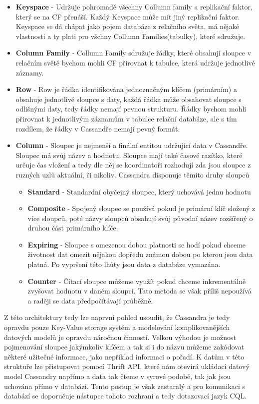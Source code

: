 \begin{itemize}
\item \textbf{Keyspace} - Udržuje pohromadě všechny Collumn family a replikační faktor, který se na CF přenáší. Každý Keyspace může mít jiný replikační faktor. Keyspace se dá chápat jako pojem databáze z relačního světa, má nějaké vlastnosti a ty plati pro všchny Collumn Families(tabulky), které sdružuje.
\item \textbf{Column Family} - Collumn Family sdružuje řádky, které obsahují sloupce v relačním světě bychom mohli CF přirovnat k tabulce, která udržuje jednotlivé záznamy. 
\item \textbf{Row} - Row je řádka identifikována jednoznačným klíčem (primárním) a obsahuje jednotlivé sloupce s daty, každá řádka může obsahovat sloupce s odlišnými daty, tedy řádky nemají pevnou strukturu. Řádky bychom mohli přirovnat k jednotlivým záznamům v tabulce relační databáze, ale s tím rozdílem, že řádky v Cassandře nemají pevný formát. 
\item \textbf{Column} - Sloupec je nejmenší a finální entitou udržující data v Cassandře. Sloupec má svůj název a hodnotu. Sloupce mají také časové razítko, které určuje čas vložení a tedy dle něj se koordinatoři rozhodují zda jsou sloupce z ruzných uzlů aktuální, či nikoliv. Cassandra disponuje těmito druhy sloupců

\begin{itemize}
\item \textbf{Standard} -  Standardní obyčejný sloupec, který uchovává jednu hodnotu
\item \textbf{Composite} - Spojený sloupec se používá pokud je primární klíč složený z více sloupců, poté názvy sloupců obsahují svůj původní název rozšířený o druhou část primárního klíče. 
\item \textbf{Expiring} - Sloupce s omezenou dobou platnosti se hodí pokud chceme životnost dat omezit nějakou dopředu známou dobou po kterou jsou data platná. Po vypršení této lhůty jsou data z databáze vymazána.
\item \textbf{Counter} - Čítací sloupce můžeme využít pokud chceme inkrementálně zvyšovat hodnotu v daném sloupci. Tato metoda se však příliš nepoužívá a raději se data předpočítávají průběžně. 
\end{itemize}
\end{itemize}



Z této architektury tedy lze naprvní pohled usoudit, že Cassandra je tedy opravdu pouze Key-Value storage systém a modelování komplikovanějších datových modelů je opravdu náročnou činností. Velkou výhodou je možnost pojmenování sloupce jakýmkoliv klíčem a tak si i do názvu můžeme zakódovat některé užitečné informace, jako nepříklad informaci o pořadí. K datům v této struktuře lze přistupovat pomocí Thrift API, které nám otevírá ukládací datový model Cassandry napřímo a data tak čteme v syrové podobě, tak jak jsou uchována přímo v databázi. Tento postup je však zastaralý a pro komunikaci s databází se doporučuje nástupce tohoto rozhraní a tedy dotazovací jazyk CQL. 

